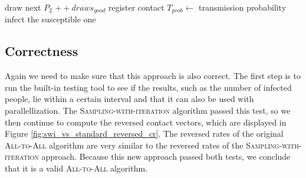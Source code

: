 \begin{algorithm}
\begin{algorithmic}[1]
                                    \State draw next $P_{2}$
                                \EndIf
                                \State $++draws_{good}$
                                \State register contact
                                    \State $T_{prob} \gets$ transmission probability
                                        \State infect the susceptible one
                                    \EndIf
                                \EndIf
                            \EndWhile
                        \EndIf
                    \EndForeach
                \EndIf
            \EndFor
        \EndFor
    \EndIf
\end{algorithmic}
\end{algorithm}

\subsection{Correctness}
\label{subsec:correctness_sampling_with_iteration}
Again we need to make sure that this approach is also correct. The first step is to run the built-in testing tool to see if the results, such as the number of infected people, lie within a certain interval and that it can also be used with parallellization. The \textsc{Sampling-with-iteration} algorithm passed this test, so we then continue to compute the reversed contact vectors, which are displayed in Figure \ref{fig:swi_vs_standard_reversed_cr}. The reversed rates of the original \textsc{All-to-All} algorithm are very similar to the reversed rates of the \textsc{Sampling-with-iteration} approach. Because this new approach passed both tests, we conclude that it is a valid \textsc{All-to-All} algorithm.


